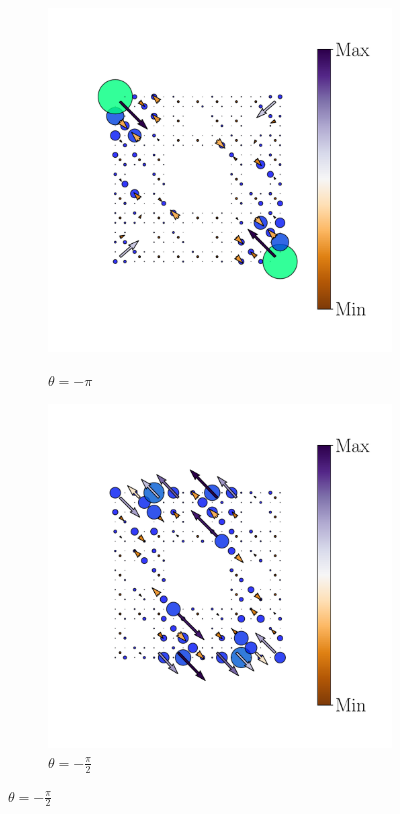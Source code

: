 \begin{figure}[h!]
     
     \begin{minipage}[h!]{1.1\textwidth}
          \begin{subfigure}[b!]{0.2 \textwidth}
             \caption{$\theta = -\pi$}
             \includegraphics[width=\textwidth]{Imagenes/Resultados_pump_Fractal/x/hoti_pomp_x_neg1.pdf}
             \label{}
         \end{subfigure}\hspace*{-0.5em}
          \begin{subfigure}[b!]{0.2 \textwidth}
             \caption*{$\theta = -\frac{\pi}{2}$}
             \includegraphics[width=\textwidth]{Imagenes/Resultados_pump_Fractal/x/hoti_pomp_x_neg2.pdf}

\end{subfigure}
\end{minipage}
\end{figure}
